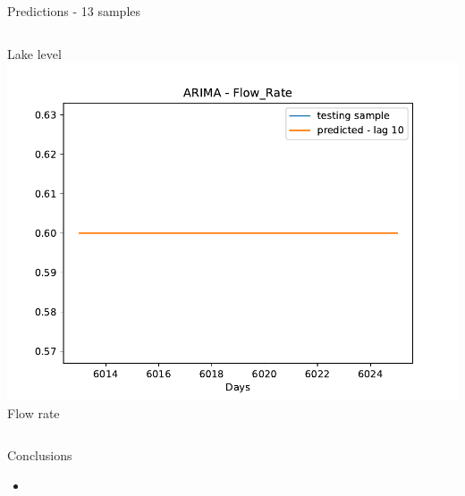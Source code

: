 \documentclass[aspectratio=169, glossy]{beamer}
\begin{document}
\begin{frame}{Predictions - 13 samples}
\begin{columns}
\begin{column}{0.5\columnwidth}
\begin{center}
        \tiny{Lake level}\\
        \vspace{0.5em}
        \includegraphics[width=0.5\columnwidth]{../plots/arima_flow_rate_prediction.pdf}\\
        \tiny{Flow rate}
      \end{center}
    \end{column}
  \end{columns}
\end{frame}

\begin{frame}{Conclusions}
  \begin{itemize}
    \item 
  \end{itemize}
\end{frame}

\end{document}
